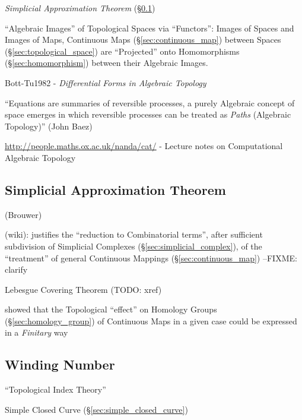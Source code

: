 \emph{Simplicial Approximation Theorem}
(\S\ref{sec:simplicial_approximation_theorem})

``Algebraic Images'' of Topological Spaces via ``Functors'': Images of
Spaces and Images of Maps, Continuous Maps
(\S\ref{sec:continuous_map}) between Spaces
(\S\ref{sec:topological_space}) are ``Projected'' onto Homomorphisms
(\S\ref{sec:homomorphism}) between their Algebraic
Images.\cite{hatcher02}

Bott-Tu1982 - \emph{Differential Forms in Algebraic Topology}

``Equations are summaries of reversible processes, a purely Algebraic concept of
space emerges in which reversible processes can be treated as \emph{Paths}
(Algebraic Topology)''
(John Baez)

\url{http://people.maths.ox.ac.uk/nanda/cat/} - Lecture notes on Computational
Algebraic Topology



\subsection{Simplicial Approximation Theorem}
\label{sec:simplicial_approximation_theorem}

(Brouwer)

(wiki): justifies the ``reduction to Combinatorial terms'', after sufficient
subdivision of Simplicial Complexes (\S\ref{sec:simplicial_complex}), of the
``treatment'' of general Continuous Mappings (\S\ref{sec:continuous_map})
--FIXME: clarify

Lebesgue Covering Theorem (TODO: xref)

showed that the Topological ``effect'' on Homology Groups
(\S\ref{sec:homology_group}) of Continuous Maps in a given case could be
expressed in a \emph{Finitary} way



\subsection{Winding Number}\label{sec:winding_number}

``Topological Index Theory''

Simple Closed Curve (\S\ref{sec:simple_closed_curve})



